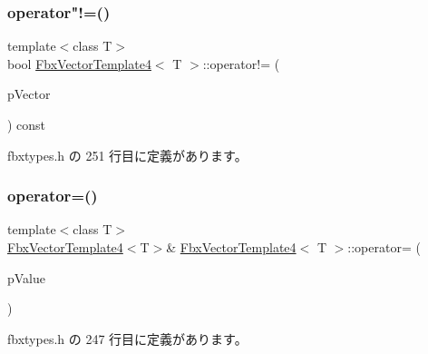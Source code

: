 \subsubsection{\texorpdfstring{operator"!=()}{operator!=()}}
{\footnotesize\ttfamily template$<$class T$>$ \\
bool \hyperlink{class_fbx_vector_template4}{Fbx\+Vector\+Template4}$<$ T $>$\+::operator!= (\begin{DoxyParamCaption}\item[{const \hyperlink{class_fbx_vector_template4}{Fbx\+Vector\+Template4}$<$ T $>$ \&}]{p\+Vector }\end{DoxyParamCaption}) const\hspace{0.3cm}{\ttfamily [inline]}}



 fbxtypes.\+h の 251 行目に定義があります。

\mbox{\label{class_fbx_vector_template4_a4cfd0c8e3412fff0ebd0b8f40865240e}} 
\subsubsection{\texorpdfstring{operator=()}{operator=()}\hspace{0.1cm}{\footnotesize\ttfamily [1/3]}}
{\footnotesize\ttfamily template$<$class T$>$ \\
\hyperlink{class_fbx_vector_template4}{Fbx\+Vector\+Template4}$<$T$>$\& \hyperlink{class_fbx_vector_template4}{Fbx\+Vector\+Template4}$<$ T $>$\+::operator= (\begin{DoxyParamCaption}\item[{const T \&}]{p\+Value }\end{DoxyParamCaption})\hspace{0.3cm}{\ttfamily [inline]}}



 fbxtypes.\+h の 247 行目に定義があります。

\mbox{\label{class_fbx_vector_template4_aed4c70484a78794cf73ca8b0965f395c}} 
